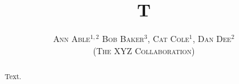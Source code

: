 \documentclass[12pt,preprint]{aastex}
\begin{document}
\title{T}
\author{\textsc{
Ann Able$^{1,2}$
Bob Baker$^{3}$, 
Cat Cole$^{1}$, 
Dan Dee$^{2}$\\
(The XYZ Collaboration)\\
}}
\begin{abstract}
Text.
\end{abstract}
\maketitle
\end{document}
